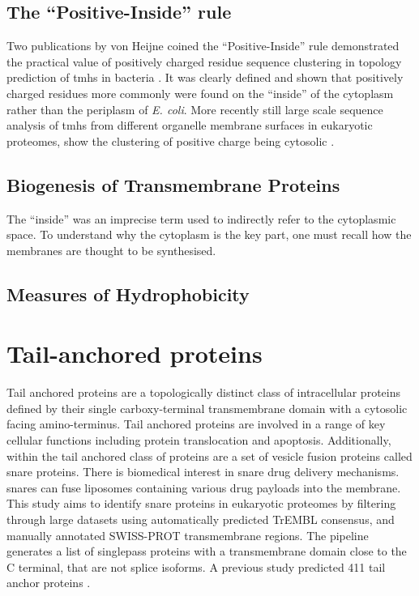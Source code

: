 \subsection{The ``Positive-Inside'' rule}

Two publications by von Heijne coined the ``Positive-Inside'' rule demonstrated the practical value of positively charged residue sequence clustering in topology prediction of \gls{tmh}s in bacteria \cite{VonHeijne1989,VonHeijne1992}. It was clearly defined and shown that positively charged residues more commonly were found on the ``inside'' of the cytoplasm rather than the periplasm of {\it E. coli}. More recently still large scale sequence analysis of \gls{tmh}s from different organelle membrane surfaces in eukaryotic proteomes, show the clustering of positive charge being cytosolic \cite{Sharpe2010, Baeza-Delgado2013, Pogozheva2013}.


\subsection{Biogenesis of Transmembrane Proteins}

The ``inside'' was an imprecise term used to indirectly refer to the cytoplasmic space. To understand why the cytoplasm is the key part, one must recall how the membranes are thought to be synthesised.

\subsection{Measures of Hydrophobicity}

\section{Tail-anchored proteins}

Tail anchored proteins are a topologically distinct class of intracellular proteins defined by their single carboxy-terminal transmembrane domain with a cytosolic facing amino-terminus. Tail anchored proteins are involved in a range of key cellular functions including protein translocation and apoptosis. Additionally, within the tail anchored class of proteins are a set of vesicle fusion proteins called \gls{snare} proteins. There is biomedical interest in \gls{snare} drug delivery mechanisms. \gls{snare}s can fuse liposomes containing various drug payloads into the membrane. This study aims to identify \gls{snare} proteins in eukaryotic proteomes by filtering through large datasets using automatically predicted TrEMBL consensus, and manually annotated SWISS-PROT transmembrane regions. The pipeline generates a list of singlepass proteins with a transmembrane domain close to the C terminal, that are not splice isoforms. A previous study predicted 411 tail anchor proteins \cite{Kalbfleisch2007}.

